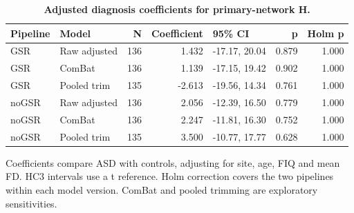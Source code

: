 \begin{table}[H]
\centering\small
\caption{\textbf{Adjusted diagnosis coefficients for primary-network H.}}\label{tab:primary}
\begin{tabular}{llrrlrr}
\toprule
Pipeline & Model & N & Coefficient & 95\% CI & p & Holm p \\
\midrule
GSR & Raw adjusted & 136 & 1.432 & -17.17, 20.04 & 0.879 & 1.000 \\
GSR & ComBat & 136 & 1.139 & -17.15, 19.42 & 0.902 & 1.000 \\
GSR & Pooled trim & 135 & -2.613 & -19.56, 14.34 & 0.761 & 1.000 \\
noGSR & Raw adjusted & 136 & 2.056 & -12.39, 16.50 & 0.779 & 1.000 \\
noGSR & ComBat & 136 & 2.247 & -11.81, 16.30 & 0.752 & 1.000 \\
noGSR & Pooled trim & 135 & 3.500 & -10.77, 17.77 & 0.628 & 1.000 \\
\bottomrule
\end{tabular}
\begin{flushleft}\footnotesize
Coefficients compare ASD with controls, adjusting for site, age, FIQ and mean FD. HC3 intervals use a t reference. Holm correction covers the two pipelines within each model version. ComBat and pooled trimming are exploratory sensitivities.
\end{flushleft}
\end{table}
